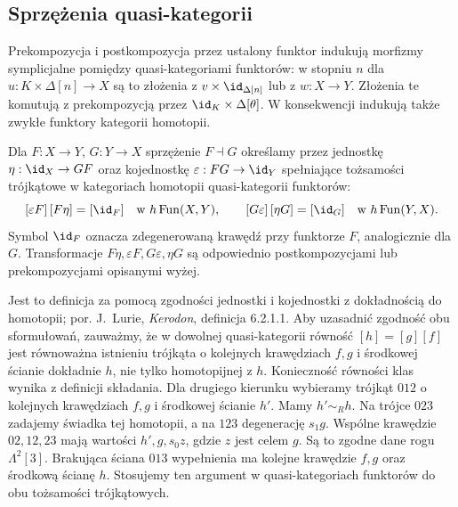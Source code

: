 \subsection{Sprzężenia quasi-kategorii}

Prekompozycja i postkompozycja przez ustalony funktor indukują morfizmy symplicjalne pomiędzy quasi-kategoriami funktorów: w stopniu $n$ dla $u:K\times\Delta[n]\to X$ są to złożenia z $v\times\id_{\Delta[n]}$ lub z $w:X\to Y$. Złożenia te komutują z prekompozycją przez $\id_K\times\Delta[\theta]$. W konsekwencji indukują także zwykłe funktory kategorii homotopii.

\begin{definicja}[Sprzężenie]\label{cat:def:quasicat-adjunction}
Dla $F:X\to Y$, $G:Y\to X$ sprzężenie $F\dashv G$ określamy przez jednostkę $\eta:\id_X\to GF$ oraz kojednostkę $\varepsilon:FG\to\id_Y$ spełniające tożsamości trójkątowe w kategoriach homotopii quasi-kategorii funktorów:
\[
 [\varepsilon F]\,[F\eta]=[\id_F]
 \quad\text{w }h\operatorname{Fun}(X,Y),
 \qquad
 [G\varepsilon]\,[\eta G]=[\id_G]
 \quad\text{w }h\operatorname{Fun}(Y,X).
\]
Symbol $\id_F$ oznacza zdegenerowaną krawędź przy funktorze $F$, analogicznie dla $G$. Transformacje $F\eta,\varepsilon F,G\varepsilon,\eta G$ są odpowiednio postkompozycjami lub prekompozycjami opisanymi wyżej.
\end{definicja}
Jest to definicja za pomocą zgodności jednostki i kojednostki z dokładnością do homotopii; por. J.~Lurie, \emph{Kerodon}, definicja 6.2.1.1. Aby uzasadnić zgodność obu sformułowań, zauważmy, że w dowolnej quasi-kategorii równość $[h]=[g][f]$ jest równoważna istnieniu trójkąta o kolejnych krawędziach $f,g$ i środkowej ścianie dokładnie $h$, nie tylko homotopijnej z $h$. Konieczność równości klas wynika z definicji składania. Dla drugiego kierunku wybieramy trójkąt $012$ o kolejnych krawędziach $f,g$ i środkowej ścianie $h'$. Mamy $h'\sim_R h$. Na trójce $023$ zadajemy świadka tej homotopii, a na $123$ degenerację $s_1g$. Wspólne krawędzie $02,12,23$ mają wartości $h',g,s_0z$, gdzie $z$ jest celem $g$. Są to zgodne dane rogu $\Lambda^2[3]$. Brakująca ściana $013$ wypełnienia ma kolejne krawędzie $f,g$ oraz środkową ścianę $h$. Stosujemy ten argument w quasi-kategoriach funktorów do obu tożsamości trójkątowych.

